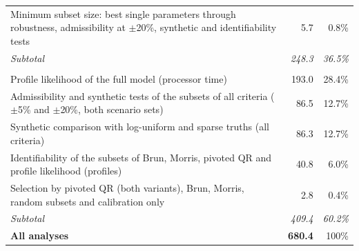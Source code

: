 \begin{longtable}{@{}>{\raggedright\arraybackslash}p{11.2cm}rr@{}}
\quad Minimum subset size: best single parameters through robustness, admissibility at $\pm$20\%, synthetic and identifiability tests & 5.7 & 0.8\% \\
\quad \emph{Subtotal} & \emph{248.3} & \emph{36.5\%} \\
\addlinespace
\multicolumn{3}{@{}l}{\textbf{Comparison with other criteria}} \\
\quad Profile likelihood of the full model (processor time) & 193.0 & 28.4\% \\
\quad Admissibility and synthetic tests of the subsets of all criteria ($\pm$5\% and $\pm$20\%, both scenario sets) & 86.5 & 12.7\% \\
\quad Synthetic comparison with log-uniform and sparse truths (all criteria) & 86.3 & 12.7\% \\
\quad Identifiability of the subsets of Brun, Morris, pivoted QR and profile likelihood (profiles) & 40.8 & 6.0\% \\
\quad Selection by pivoted QR (both variants), Brun, Morris, random subsets and calibration only & 2.8 & 0.4\% \\
\quad \emph{Subtotal} & \emph{409.4} & \emph{60.2\%} \\
\addlinespace
\midrule
\textbf{All analyses} & \textbf{680.4} & 100\% \\
\bottomrule
\end{longtable}
